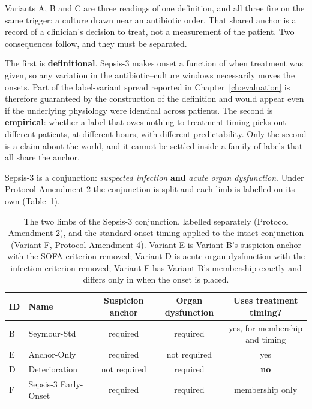 Variants A, B and C are three readings of one definition, and all three fire on
the same trigger: a culture drawn near an antibiotic order. That shared anchor
is a record of a clinician's decision to treat, not a measurement of the
patient. Two consequences follow, and they must be separated.

The first is \textbf{definitional}. Sepsis-3 \cite{singer2016sepsis3} makes
onset a function of when treatment was given, so any variation in the
antibiotic--culture windows necessarily moves the onsets. Part of the
label-variant spread reported in Chapter~\ref{ch:evaluation} is therefore
guaranteed by the construction of the definition and would appear even if the
underlying physiology were identical across patients. The second is
\textbf{empirical}: whether a label that owes nothing to treatment timing picks
out different patients, at different hours, with different predictability. Only
the second is a claim about the world, and it cannot be settled inside a family
of labels that all share the anchor.

Sepsis-3 is a conjunction: \emph{suspected infection} \textbf{and}
\emph{acute organ dysfunction}. Under Protocol Amendment 2 the conjunction is
split and each limb is labelled on its own
(Table~\ref{tab:alt_label_variants}).

\begin{table}[H]
    \centering\small
    \begin{tabular}{llccc}
        \toprule
        \textbf{ID} & \textbf{Name} & \textbf{Suspicion anchor}
        & \textbf{Organ dysfunction} & \textbf{Uses treatment timing?} \\
        \midrule
        B & Seymour-Std    & required     & required     & yes, for membership and timing \\
        E & Anchor-Only    & required     & not required & yes \\
        D & Deterioration  & not required & required     & \textbf{no} \\
        F & Sepsis-3 Early-Onset & required & required   & membership only \\
        \bottomrule
    \end{tabular}
    \caption{The two limbs of the Sepsis-3 conjunction, labelled separately
    (Protocol Amendment 2), and the standard onset timing applied to the intact
    conjunction (Variant F, Protocol Amendment 4). Variant E is Variant B's
    suspicion anchor with the SOFA criterion removed; Variant D is acute organ
    dysfunction with the infection criterion removed; Variant F has Variant B's
    membership exactly and differs only in when the onset is placed.}
    \label{tab:alt_label_variants}
\end{table}


